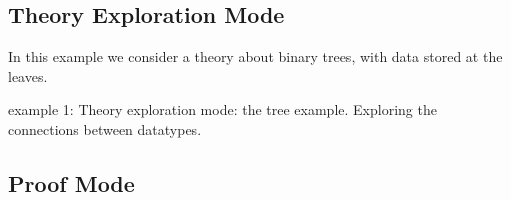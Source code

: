 \subsection{Theory Exploration Mode}

In this example we consider a theory about binary trees, with data stored at the leaves. 

 
example 1: Theory exploration mode: the tree example. Exploring the connections between datatypes. 

\subsection{Proof Mode}
